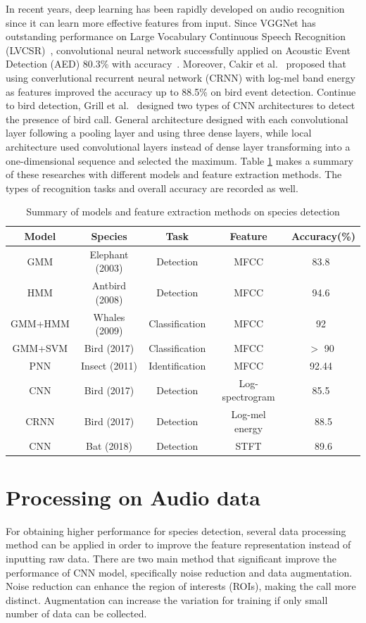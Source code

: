 In recent years, deep learning has been rapidly developed on audio recognition since it can learn more effective features from input. Since VGGNet has outstanding performance on Large Vocabulary Continuous Speech Recognition (LVCSR)~\cite{sercu2016very}, convolutional neural network successfully applied on Acoustic Event Detection (AED) 80.3\% with accuracy~\cite{takahashi2016deep}. 
Moreover, Cakir et al.~\cite{cakir2017convolutional} proposed that using converlutional recurrent neural network (CRNN) with log-mel band energy as features improved the accuracy up to 88.5\% on bird event detection. Continue to bird detection, Grill et al.~\cite{8081512} designed two types of CNN architectures to detect the presence of bird call. General architecture designed with each convolutional layer following a pooling layer and using three dense layers, while local architecture used convolutional layers instead of dense layer transforming into a one-dimensional sequence and selected the maximum. Table \ref{tabel:summarymodel} makes a summary of these researches with different models and feature extraction methods. The types of recognition tasks and overall accuracy are recorded as well.
\begin{table}[htp]
\centering
\caption{Summary of models and feature extraction methods on species detection}
\label{tabel:summarymodel}
\begin{tabular}{ccccc}
\hline
Model& Species& Task& Feature& Accuracy(\%)\\
\hline
GMM& Elephant (2003)& Detection&MFCC& 83.8~\cite{clemins2003application}\\
HMM& Antbird (2008)& Detection&MFCC& 94.6~\cite{trifa2008automated}\\
GMM+HMM& Whales (2009)&Classification& MFCC & 92~\cite{brown2009hidden}\\
GMM+SVM& Bird (2017)& Classification& MFCC& $>$ 90~\cite{zhao2017automated}\\
PNN& Insect (2011)& Identification& MFCC& 92.44~\cite{le2011insect}\\
CNN& Bird (2017)&Detection& Log-spectrogram& 85.5~\cite{cakir2017convolutional}\\
CRNN& Bird (2017)& Detection& Log-mel energy
& 88.5 \cite{cakir2017convolutional}\\
CNN& Bat (2018)& Detection& STFT
& 89.6 \cite{batdetect18}\\
\hline
\end{tabular}
\end{table}
\section{Processing on Audio data}
For obtaining higher performance for species detection, several data processing method can be applied in order to improve the feature representation instead of inputting raw data. There are two main method that significant improve the performance of CNN model, specifically noise reduction and data augmentation. Noise reduction can enhance the region of interests (ROIs), making the call more distinct. Augmentation can increase the variation for training if only small number of data can be collected.

